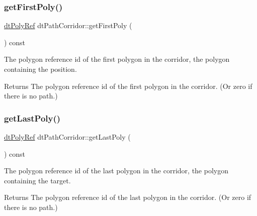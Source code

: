 \subsubsection{\texorpdfstring{get\+First\+Poly()}{getFirstPoly()}\hspace{0.1cm}{\footnotesize\ttfamily [2/2]}}
{\footnotesize\ttfamily \hyperlink{group__detour_gab4e0b2257a670c1a800057999612b466}{dt\+Poly\+Ref} dt\+Path\+Corridor\+::get\+First\+Poly (\begin{DoxyParamCaption}{ }\end{DoxyParamCaption}) const\hspace{0.3cm}{\ttfamily [inline]}}

The polygon reference id of the first polygon in the corridor, the polygon containing the position. \begin{DoxyReturn}{Returns}
The polygon reference id of the first polygon in the corridor. (Or zero if there is no path.) 
\end{DoxyReturn}
\mbox{\label{classdtPathCorridor_a4d23baaf31661832ea81fd5a6fcc0a59}} 
\subsubsection{\texorpdfstring{get\+Last\+Poly()}{getLastPoly()}\hspace{0.1cm}{\footnotesize\ttfamily [1/2]}}
{\footnotesize\ttfamily \hyperlink{group__detour_gab4e0b2257a670c1a800057999612b466}{dt\+Poly\+Ref} dt\+Path\+Corridor\+::get\+Last\+Poly (\begin{DoxyParamCaption}{ }\end{DoxyParamCaption}) const\hspace{0.3cm}{\ttfamily [inline]}}

The polygon reference id of the last polygon in the corridor, the polygon containing the target. \begin{DoxyReturn}{Returns}
The polygon reference id of the last polygon in the corridor. (Or zero if there is no path.) 
\end{DoxyReturn}
\mbox{\label{classdtPathCorridor_a4d23baaf31661832ea81fd5a6fcc0a59}} 
